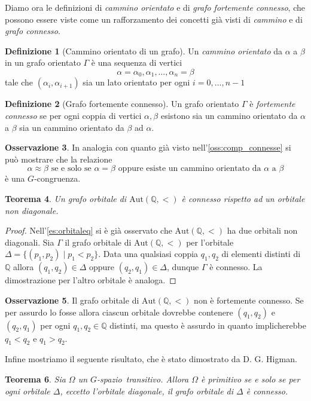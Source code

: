 \documentclass[12pt,a4paper,openright]{report}
\newcommand{\aut}{ \mathrm{Aut} ( \mathbb{Q},< ) } %
\newcommand{\Q}{\mathbb{Q}} %
\newcommand{\0}{\setminus\{0\}} %
\newcommand{\Gsp}{$G$-spazio~} %
\theoremstyle{definition}
\newtheorem{defn}{Definizione}[chapter]
\newtheorem{oss}[defn]{Osservazione}
\theoremstyle{plain}
\newtheorem{theo}[defn]{Teorema}
\begin{document}
Diamo ora le definizioni di \emph{cammino orientato} e di \emph{grafo fortemente connesso}, che possono essere viste come un rafforzamento dei concetti già visti di \emph{cammino} e di \emph{grafo connesso}.
\begin{defn}[Cammino orientato di un grafo]
    Un \emph{cammino orientato} da $\alpha$ a $\beta$ in un grafo orientato $\Gamma$ è una sequenza di vertici
    \[\alpha=\alpha_0,\alpha_1,\ldots,\alpha_n=\beta\]
    tale che $(\alpha_i,\alpha_{i+1})$ sia un lato orientato per ogni $i=0,\ldots,n-1$
\end{defn}
\begin{defn}[Grafo fortemente connesso]
    Un grafo orientato $\Gamma$ è \emph{fortemente connesso} se per ogni coppia di vertici $\alpha,\beta$ esistono sia un cammino orientato da $\alpha$ a $\beta$ sia un cammino orientato da $\beta$ ad $\alpha$.
\end{defn}
\begin{oss}
     In analogia con quanto già visto nell'\cref{oss:comp_connesse} si può mostrare che la relazione 
     \[ \alpha \approx \beta \mbox{ se e solo se }\alpha=\beta \mbox{ oppure esiste un cammino orientato da } \alpha \mbox{ a } \beta\] 
     è una $G$-congruenza. 
\end{oss}
\begin{theo}
    Un grafo orbitale di $\aut$ è connesso rispetto ad un orbitale non diagonale.
\end{theo}
\begin{proof}
    Nell'\cref{es:orbitaleq} si è già osservato che $\aut$ ha due orbitali non diagonali. Sia $\Gamma$ il grafo orbitale di $\aut$ per l'orbitale $\Delta=\{(p_1,p_2)\mid p_1<p_2\}$. Data una qualsiasi coppia $q_1,q_2$ di elementi distinti di $\Q$ allora $(q_1,q_2) \in \Delta$ oppure  $(q_2,q_1) \in \Delta$, dunque $\Gamma$ è connesso. La dimostrazione per l'altro orbitale è analoga.
\end{proof}
\begin{oss}
    Il grafo orbitale di $\aut$ non è fortemente connesso. Se per assurdo lo fosse allora ciascun orbitale dovrebbe contenere $(q_1,q_2)$ e $(q_2,q_1)$ per ogni $q_1,q_2 \in \Q$ distinti, ma questo è assurdo in quanto implicherebbe $q_1<q_2$ e $q_1>q_2$.
\end{oss}
Infine mostriamo il seguente risultato, che è stato dimostrato da D. G. Higman.
\begin{theo}
    Sia $\Omega$ un \Gsp transitivo. Allora $\Omega$ è primitivo se e solo se per ogni orbitale $\Delta$, eccetto l'orbitale diagonale, il grafo orbitale di $\Delta$ è connesso.
\end{theo}
\end{document}
